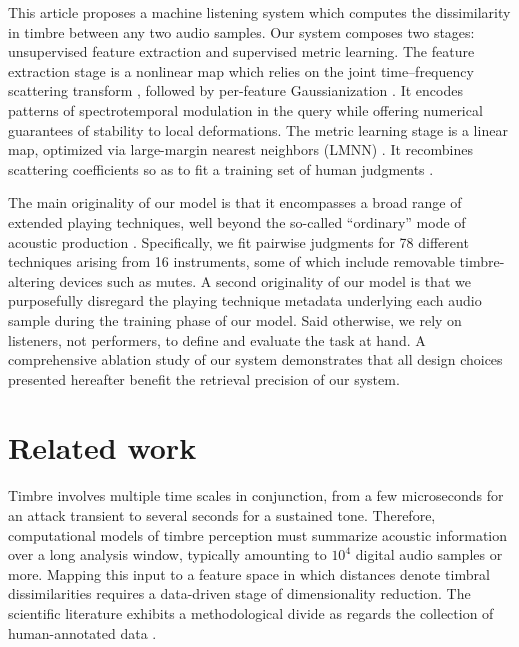 \documentclass{bmcart}
\begin{document}
This article proposes a machine listening system which computes the dissimilarity in timbre between any two audio samples.
Our system composes two stages: unsupervised feature extraction and supervised metric learning.
The feature extraction stage is a nonlinear map which relies on the joint time--frequency scattering transform \cite{anden2015joint}, followed by per-feature Gaussianization \cite{lostanlen2018relevance}.
It encodes patterns of spectrotemporal modulation in the query while offering numerical guarantees of stability to local deformations.
The metric learning stage is a linear map, optimized via large-margin nearest neighbors (LMNN) \cite{weinberger2009distance}.
It recombines scattering coefficients so as to fit a training set of human judgments \cite{mcadams1995psychres}.

The main originality of our model is that it encompasses a broad range of extended playing techniques, well beyond the so-called ``ordinary'' mode of acoustic production \cite{lostanlen2018extended}.
Specifically, we fit pairwise judgments for 78 different techniques arising from 16 instruments, some of which include removable timbre-altering devices such as mutes.
A second originality of our model is that we purposefully disregard the playing technique metadata underlying each audio sample during the training phase of our model.
Said otherwise, we rely on listeners, not performers, to define and evaluate the task at hand.
A comprehensive ablation study of our system demonstrates that all design choices presented hereafter benefit the retrieval precision of our system.




\section*{Related work}
Timbre involves multiple time scales in conjunction, from a few microseconds for an attack transient to several seconds for a sustained tone.
Therefore, computational models of timbre perception must summarize acoustic information over a long analysis window, typically amounting to $10^{4}$ digital audio samples or more.
Mapping this input to a feature space in which distances denote timbral dissimilarities requires a data-driven stage of dimensionality reduction.
The scientific literature exhibits a methodological divide as regards the collection of human-annotated data \cite{siedenburg2016jnmr}.
\end{document}
